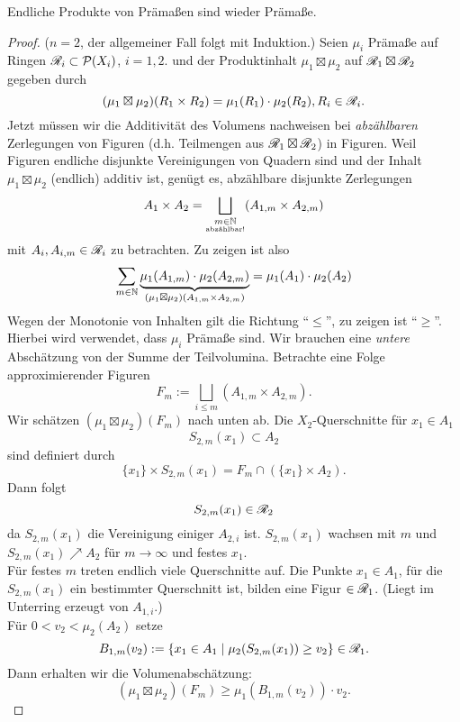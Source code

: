 \begin{satz}
\begin{mdframed}
Endliche Produkte von Prämaßen sind wieder Prämaße.
\end{mdframed}
\begin{proof}
($n=2$, der allgemeiner Fall folgt mit Induktion.)   \newline
Seien $\mu_i$ Prämaße auf Ringen $\mathscr{R}_i \subset \mathcal{P}(X_i)$, $i=1,2$. und der Produktinhalt $\mu_1 \boxtimes \mu_2$ auf $\mathscr{R}_1 \boxtimes \mathscr{R}_2$ gegeben durch
$$(\mu_1 \boxtimes \mu_2) (R_1 \times R_2) = \mu_1 (R_1) \cdot \mu_2(R_2), R_i \in \mathscr{R}_i.$$ Jetzt müssen wir die Additivität des Volumens nachweisen bei \emph{abzählbaren} Zerlegungen von Figuren (d.h. Teilmengen aus $\mathscr{R}_1 \boxtimes \mathscr{R}_2$) in Figuren. Weil Figuren endliche disjunkte Vereinigungen von Quadern sind und der Inhalt $\mu_1 \boxtimes \mu_2$ (endlich) additiv ist, genügt es, abzählbare disjunkte Zerlegungen
$$
A_1 \times A_2 = \bigsqcup_{\substack{m\in \mathbb{N} \\ \text{\tiny abzählbar!}}} (A_{1,m} \times A_{2,m})
$$
mit $A_i, A_{i,m} \in \mathscr{R}_i$ zu betrachten. Zu zeigen ist also
$$
\sum_{m\in \mathbb{N}} \underbrace{\mu_1(A_{1,m}) \cdot \mu_2(A_{2,m})}_{(\mu_1 \boxtimes \mu_2) (A_{1,m}\times A_{2,m})} = \mu_1 (A_1) \cdot \mu_2(A_2)
$$
Wegen der Monotonie von Inhalten gilt die Richtung ``$\leq$'', zu zeigen ist ``$\geq$''.
Hierbei wird verwendet, dass $\mu_i$ Prämaße sind. Wir brauchen eine \emph{untere} Abschätzung von der Summe der Teilvolumina. Betrachte eine Folge approximierender Figuren
$$F_m := \bigsqcup_{i \leq m}(A_{1,m} \times A_{2,m}).$$
Wir schätzen $(\mu_1 \boxtimes \mu_2) (F_m)$ nach unten ab. Die $X_2$-Querschnitte für $x_1 \in A_1$ 
$$S_{2,m}(x_1) \subset A_2$$
sind definiert durch
$$\{x_1\} \times S_{2,m}(x_1) = F_m \cap ( \{x_1\} \times A_2).$$
Dann folgt
$$S_{2,m} (x_1) \in \mathscr{R}_2$$
da $S_{2,m}(x_1)$ die Vereinigung einiger $A_{2,i}$ ist. $S_{2,m}(x_1)$ wachsen mit $m$ und $S_{2,m}(x_1) \nearrow A_2$ für $m \to \infty$ und festes $x_1$. \\
Für festes $m$ treten endlich viele Querschnitte auf. Die Punkte $x_1 \in A_1$, für die $S_{2,m}(x_1)$ ein bestimmter Querschnitt ist, bilden eine Figur $\in \mathscr{R}_1$. (Liegt im Unterring erzeugt von $A_{1,i}$.) \\
Für $0<v_2<\mu_2(A_2)$ setze
$$
B_{1,m}(v_2) := \{x_1 \in A_1 \mid \mu_2(S_{2,m} (x_1) ) \geq v_2 \} \in \mathscr{R}_1.
$$
Dann erhalten wir die Volumenabschätzung:
$$(\mu_1 \boxtimes \mu_2) (F_m) \geq \mu_1 (B_{1,m}(v_2))\cdot v_2.$$

\end{proof}
\end{satz}
